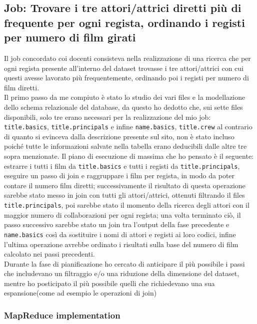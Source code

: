 \documentclass[hidelinks]{article}
\begin{document}
\subsection{Job: Trovare i tre attori/attrici diretti più di frequente per ogni regista, ordinando i registi per numero di film girati}

Il job concordato coi docenti consisteva nella realizzazione di una ricerca che per ogni regista presente all'interno del dataset trovasse i tre attori/attrici con cui questi avesse lavorato più frequentemente, ordinando poi i registi per numero di film diretti.\\
Il primo passo da me compiuto è stato lo studio dei vari files e la modellazione dello schema relazionale del database, da questo ho dedotto che, sui sette files disponibili, solo tre erano necessari per la realizzazione del mio job: \texttt{title.basics}, \texttt{title.principals} e infine \texttt{name.basics}, \texttt{title.crew} al contrario di quanto si evinceva dalla descrizione presente sul sito, non è stato incluso poiché tutte le informazioni salvate nella tabella erano deducibili dalle altre tre sopra menzionate.
Il piano di esecuzione di massima che ho pensato è il seguente: estrarre i tutti i film da \texttt{title.basics} e tutti i registi da \texttt{title.principals}, eseguire un passo di join e raggruppare i film per regista, in modo da poter contare il numero film diretti; successivamente il risultato di questa operazione sarebbe stato messo in join con tutti gli attori/attrici, ottenuti filtrando il files \texttt{title.principals}, poi sarebbe stato il momento della ricerca degli attori con il maggior numero di collaborazioni per ogni regista; una volta terminato ciò, il passo successivo sarebbe stato un join tra l'output della fase precedente e \texttt{name.basics} così da sostituire i nomi di attori e registi ai loro codici, infine l'ultima operazione avrebbe ordinato i risultati sulla base del numero di
film calcolato nei passi precedenti.\\
Durante la fase di pianificazione ho cercato di anticipare il più possibile i passi che includevano un filtraggio e/o una riduzione della dimensione del dataset, mentre ho posticipato il più possibile quelli che richiedevano una sua espansione(come ad esempio le operazioni di join) 

\subsubsection{MapReduce implementation}
\end{document}
